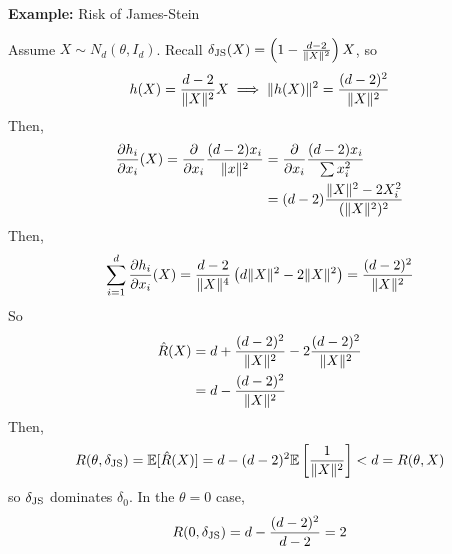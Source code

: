 \begin{example}{\textbf{Example:} Risk of James-Stein}

    Assume $X \sim N_{d}(\theta, I_{d})$. Recall $\delta_{\tt{JS}}(X) = \left(1 - \frac{d - 2}{\norm{X}^2}\right)X$, so
    \[ h(X) = \frac{d - 2}{\norm{X}^2}X \implies \norm{h(X)}^2 = \frac{(d - 2)^2}{\norm{X}^2} \]
    Then,
    \begin{align*}
        \frac{\partial h_i}{\partial x_i}(X) = \frac{\partial}{\partial x_i}\frac{(d - 2)x_i}{\norm{x}^2} &= \frac{\partial}{\partial x_i}\frac{(d - 2)x_i}{\sum x_i^2}\\
        &= (d - 2)\frac{\norm{X}^2 - 2X_i^2}{(\norm{X}^2)^2}
    \end{align*}
    Then,
    \[ \sum_{i = 1}^{d} \frac{\partial h_i}{\partial x_i}(X) = \frac{d - 2}{\norm{X}^4}\left(d\norm{X}^2 - 2\norm{X}^2\right) = \frac{(d - 2)^2}{\norm{X}^2} \]
    So
    \begin{align*}
        \hat{R}(X) &= d + \frac{(d - 2)^2}{\norm{X}^2} - 2\frac{(d - 2)^2}{\norm{X}^2}\\
        &= d - \frac{(d - 2)^2}{\norm{X}^2}
    \end{align*}
    Then,
    \[ R(\theta, \delta_{\tt{JS}}) = \E[\hat{R}(X)] = d - (d - 2)^2\E\left[\frac{1}{\norm{X}^2}\right] < d = R(\theta, X) \]
    so $\delta_{\tt{JS}}$ dominates $\delta_0$. In the $\theta = 0$ case,
    \[ R(0, \delta_{\tt{JS}}) = d - \frac{(d - 2)^2}{d - 2} = 2 \]
\end{example}
